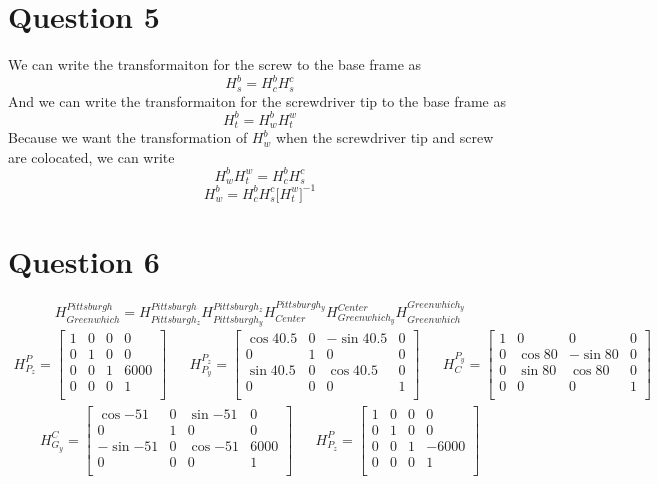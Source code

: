 \documentclass[11pt]{article}
\begin{document}
\section{Question 5}
We can write the transformaiton for the screw to the base frame as 
$$
H^b_s = H^b_c H^c_s 
$$
And we can write the transformaiton for the screwdriver tip to the base frame as 
$$
H^b_t = H^b_w H^w_t 
$$
Because we want the transformation of $H^b_w$ when the screwdriver tip and screw are colocated,
we can write
$$
 H^b_w H^w_t  =H^b_c H^c_s  
$$
$$
H^b_w =
H^b_c H^c_s \big[H^w_t \big]^{-1 }
$$
\section{Question 6}
$$
H^{Pittsburgh}_{Greenwhich} = 
H_{Pittsburgh_z}^{Pittsburgh} 
H_{Pittsburgh_y}^{Pittsburgh_z} 
H_{Center}^{Pittsburgh_y} 
H^{Center}_{Greenwhich_y}
H^{Greenwhich_y}_{Greenwhich} 
$$
\begin{align*}
H_{P_z}^P = 
\begin{bmatrix}
    1 & 0 & 0 & 0 \\
    0 & 1 & 0 & 0 \\
    0 & 0 & 1 & 6000 \\
    0 & 0 & 0 & 1 \\
\end{bmatrix}
&&
H^{P_z}_{P_y} =
\begin{bmatrix}
    \cos{40.5} & 0 & -\sin{40.5} & 0 \\
    0&  1 & 0 & 0 \\
    \sin{40.5} &0&\cos{40.5} & 0 \\
    0& 0 & 0 & 1 \\
\end{bmatrix}
&&
H^{P_y}_{C} =
\begin{bmatrix}
    1 & 0 & 0 & 0 \\
    0 & \cos{80} & -\sin{80} & 0 \\
    0 & \sin{80} &\cos{80} & 0 \\
    0 & 0 & 0 & 1 \\
\end{bmatrix}
\end{align*}
\begin{align*}
H_{G_y}^{C} =
\begin{bmatrix}
    \cos{-51} & 0 & \sin{-51} & 0 \\
    0&  1 & 0 & 0 \\
    -\sin{-51} &0&\cos{-51} & 6000 \\
    0& 0 & 0 & 1 \\
\end{bmatrix}
&&
H_{P_z}^P = 
\begin{bmatrix}
    1 & 0 & 0 & 0 \\
    0 & 1 & 0 & 0 \\
    0 & 0 & 1 & -6000 \\
    0 & 0 & 0 & 1 \\
\end{bmatrix}
\end{align*}
\end{document}
